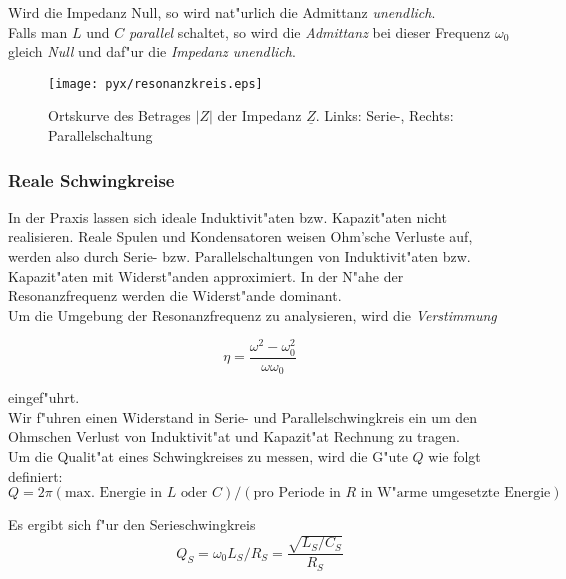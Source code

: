 \documentclass[german, 10pt, a4paper, headsepline]{scrreprt}
\theoremstyle{remark}
\begin{document}
Wird die Impedanz Null, so wird nat"urlich die Admittanz \textit{unendlich}.\\

Falls man $L$ und $C$ \textit{parallel} schaltet, so wird die \textit{Admittanz} bei dieser Frequenz $\omega_0$ gleich \textit{Null} und daf"ur die \textit{Impedanz unendlich}.

\begin{figure}[hbt]
 \begin{center}
	\texttt{[image: pyx/resonanzkreis.eps]}
 \end{center}
 \label{verlauf_leistung}
 \caption{Ortskurve des Betrages $|Z|$ der Impedanz $\underline{Z}$. Links: Serie-, Rechts: Parallelschaltung}
\end{figure}

\subsubsection{Reale Schwingkreise}

In der Praxis lassen sich ideale Induktivit"aten bzw. Kapazit"aten nicht realisieren. Reale Spulen und Kondensatoren weisen Ohm'sche Verluste auf, werden also durch Serie- bzw. Parallelschaltungen von Induktivit"aten bzw. Kapazit"aten mit Widerst"anden approximiert. In der N"ahe der Resonanzfrequenz werden die Widerst"ande dominant.\\

Um die Umgebung der Resonanzfrequenz zu analysieren, wird die \textit{Verstimmung} 

\begin{displaymath}
	\eta = \frac{\omega^2-\omega_0^2}{\omega \omega_0}
\end{displaymath}

eingef"uhrt.\\

Wir f"uhren einen Widerstand in Serie- und Parallelschwingkreis ein um den Ohmschen Verlust von Induktivit"at und Kapazit"at Rechnung zu tragen.\\
Um die Qualit"at eines Schwingkreises zu messen, wird die G"ute  $Q$ wie folgt definiert:
\begin{displaymath}
	Q = 2\pi (\text{max. Energie in }L \text{ oder } C)/(\text{pro Periode in }R \text{ in W"arme umgesetzte Energie})
\end{displaymath}

Es ergibt sich f"ur den Serieschwingkreis
\begin{displaymath}
	Q_S = \omega_0 L_S / R_S = \frac{\sqrt{L_S / C_S}}{R_S}
\end{displaymath}
\end{document}
